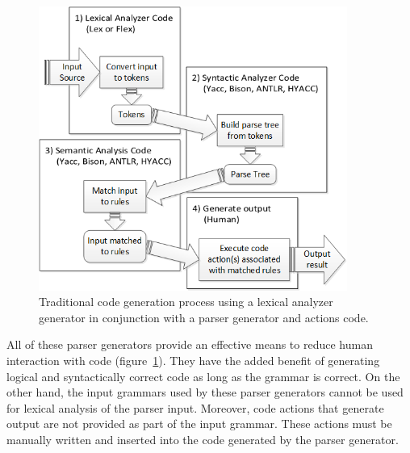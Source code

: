 \begin{figure}[htbp]
\centering
\includegraphics[width=0.9\textwidth]{figures/TraditionalCodeGenProcess.png}
\caption{Traditional code generation process using a lexical analyzer generator in conjunction with a parser generator and actions code.}
\label{fig:TraditionalCodeGenProcess}
\end{figure}

\indent
All of these parser generators provide an effective means to reduce human interaction with code (figure~\ref{fig:TraditionalCodeGenProcess}).  They have the added benefit of generating logical and syntactically correct code as long as the grammar is correct.  On the other hand, the input grammars used by these parser generators cannot be used for lexical analysis of the parser input.  Moreover, code actions that generate output are not provided as part of the input grammar.  These actions must be manually written and inserted into the code generated by the parser generator.
